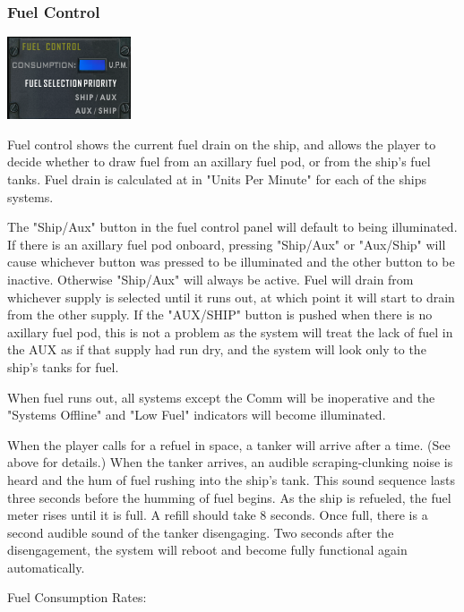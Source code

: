 \begin{itemize}
\subsubsection{Fuel Control}
\includegraphics[scale=0.70]{images/fuelcontrol.png}

Fuel control shows the current fuel drain on the ship, and allows the player
to decide whether to draw fuel from an axillary fuel pod, or from the
ship's fuel tanks.  Fuel drain is calculated at in "Units Per Minute" for
each of the ships systems.

The "Ship\slash Aux" button in the fuel control panel will default to
being illuminated.  If there is an axillary fuel pod onboard, pressing
"Ship\slash Aux" or "Aux\slash Ship" will cause whichever button was
pressed to be illuminated and the other button to be inactive.  Otherwise
"Ship\slash Aux" will always be active.  Fuel will drain from whichever
supply is selected until it runs out, at which point it will start to drain
from the other supply.  If the "AUX\slash SHIP" button is pushed when there is no axillary
fuel pod, this is not a problem as the system will treat the lack of fuel in the AUX as if that supply had run dry, and the system will look only to the ship's tanks for fuel. 

When fuel runs out, all systems except the Comm will be inoperative and
the "Systems Offline" and "Low Fuel" indicators will become illuminated.

When the player calls for a refuel in space, a tanker will arrive after a time. (See above for details.) When the tanker arrives, an audible scraping-clunking noise is heard and the hum of fuel rushing into the ship's tank. This sound sequence lasts three seconds before the humming of fuel begins. As the ship is refueled, the fuel meter rises until it is full. A refill should take 8 seconds. Once full, there is a second audible sound of the tanker disengaging. Two seconds after the disengagement, the system will reboot and become fully functional again automatically. 


Fuel Consumption Rates:


\end{itemize}
